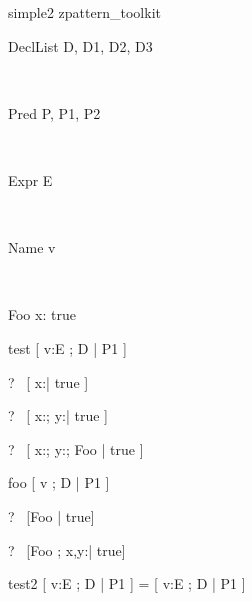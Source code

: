 \begin{zsection}
\SECTION simple2 \parents zpattern\_toolkit
\end{zsection}

\newcommand{\unfoldsTo}{\mathrel{\leadsto}}

\begin{zedjoker}{DeclList} D, D1, D2, D3\end{zedjoker} \\
\begin{zedjoker}{Pred} P, P1, P2\end{zedjoker} \\
\begin{zedjoker}{Expr} E\end{zedjoker} \\
\begin{zedjoker}{Name} v\end{zedjoker} \\

\begin{schema}{Foo}
  x:\nat
\where
  true
\end{schema}

\begin{zedrule}{test}
  [ v:E ; D | P1 ]
\end{zedrule}

\begin{zed}
  \vdash?~ [ x:\nat | true ]
\end{zed}

\begin{zed}
  \vdash?~ [ x:\nat; y:\nat | true ]
\end{zed}

\begin{zed}
  \vdash?~ [ x:\nat; y:\nat ; Foo | true ]
\end{zed}


\begin{zedrule}{foo}
  [ v ; D | P1 ]
\end{zedrule}

\begin{zed}
  \vdash?~ [Foo | true]
\end{zed}

\begin{zed}
  \vdash?~ [Foo ; x,y:\nat | true]
\end{zed}

\begin{zedrule}{test2}
  [ v:E ; D | P1 ] = [ v:E ; D | P1 ]
\end{zedrule}

